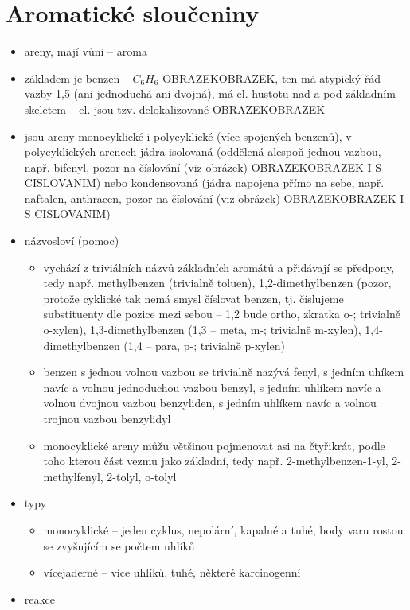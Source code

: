 \documentclass{article}
\begin{document}
\section{Aromatické sloučeniny}
\begin{itemize}
  \item areny, mají vůni -- aroma
  \item základem je benzen -- $C_6H_6$ OBRAZEKOBRAZEK, ten má atypický řád vazby 1,5 (ani jednoduchá ani dvojná), má el. hustotu nad a pod základním skeletem -- el. jsou tzv. delokalizované OBRAZEKOBRAZEK
  \item jsou areny monocyklické i polycyklické (více spojených benzenů), v polycyklických arenech jádra isolovaná (oddělená alespoň jednou vazbou, např. bifenyl, pozor na číslování (viz obrázek) OBRAZEKOBRAZEK I S CISLOVANIM) nebo kondensovaná (jádra napojena přímo na sebe, např. naftalen, anthracen, pozor na číslování (viz obrázek) OBRAZEKOBRAZEK I S CISLOVANIM)
  \item názvosloví (pomoc)
  \begin{itemize}
    \item vychází z triviálních názvů základních aromátů a přidávají se předpony, tedy např. methylbenzen (trivialně toluen), 1,2-dimethylbenzen (pozor, protože cyklické tak nemá smysl číslovat benzen, tj. číslujeme substituenty dle pozice mezi sebou -- 1,2 bude ortho, zkratka o-; trivialně o-xylen), 1,3-dimethylbenzen (1,3 -- meta, m-; trivialně m-xylen), 1,4-dimethylbenzen (1,4 -- para, p-; trivialně p-xylen)
    \item benzen s jednou volnou vazbou se trivialně nazývá fenyl, s jedním uhíkem navíc a volnou jednoduchou vazbou benzyl, s jedním uhlíkem navíc a volnou dvojnou vazbou benzyliden, s jedním uhlíkem navíc a volnou trojnou vazbou benzylidyl
    \item monocyklické areny můžu většinou pojmenovat asi na čtyřikrát, podle toho kterou část vezmu jako základní, tedy např. 2-methylbenzen-1-yl, 2-methylfenyl, 2-tolyl, o-tolyl
  \end{itemize}
  \item typy
  \begin{itemize}
    \item monocyklické -- jeden cyklus, nepolární, kapalné a tuhé, body varu rostou se zvyšujícím se počtem uhlíků
    \item vícejaderné -- více uhlíků, tuhé, některé karcinogenní
  \end{itemize}
  \item reakce
  \begin{itemize}

\end{itemize}
\end{itemize}
\end{document}
